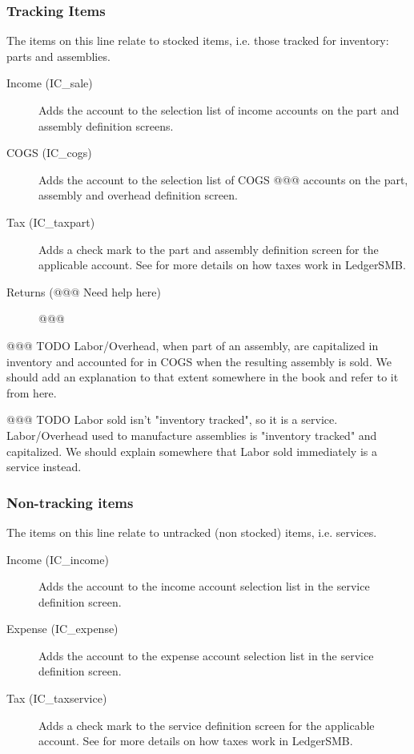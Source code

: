 \subsubsection{Tracking Items}
\label{subsubsec-coa-tracking-items}

The items on this line relate to stocked items, i.e. those tracked for inventory: parts and
assemblies.

\begin{description}
    \item[Income (IC\_sale)] Adds the account to the selection list of income accounts on the
    part and assembly definition screens.
    \item[COGS (IC\_cogs)] Adds the account to the selection list of COGS @@@ accounts on the
    part, assembly and overhead definition screen.
    \item[Tax (IC\_taxpart)] Adds a check mark to the part and assembly definition screen
    for the applicable account. See  for more details on how taxes
    work in LedgerSMB.
    \item[Returns (@@@ Need help here)] @@@
\end{description}

@@@ TODO Labor/Overhead, when part of an assembly, are capitalized in inventory and accounted for in COGS when the resulting assembly is sold. We should add an explanation to that extent somewhere in the book and refer to it from here.

@@@ TODO Labor sold isn't "inventory tracked", so it is a service. Labor/Overhead used to manufacture assemblies is "inventory tracked" and capitalized. We should explain somewhere that Labor sold immediately is a service instead.

\subsubsection{Non-tracking items}
\label{subsubsec-coa-non-tracking-items}

The items on this line relate to untracked (non stocked) items, i.e. services.

\begin{description}
    \item[Income (IC\_income)] Adds the account to the income account selection list in
    the service definition screen.
    \item[Expense (IC\_expense)] Adds the account to the expense account selection list in
    the service definition screen.
    \item[Tax (IC\_taxservice)] Adds a check mark to the service definition screen for the
    applicable account. See  for more details on how taxes work in LedgerSMB.
\end{description}

